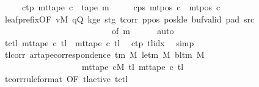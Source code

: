 \begin{isabellebody}
\ \ \ \ \ c{}{\isacharunderscore}{\kern0pt}tp{\isacharcolon}{\kern0pt}\ {\isachardoublequoteopen}mt{\isacharunderscore}{\kern0pt}tape\ c{}\ {\isacharequal}{\kern0pt}\ {\isacharquery}{\kern0pt}tape\ {\isacharquery}{\kern0pt}m{}{\isachardoublequoteclose}\isanewline
\ \ \ \ \ c{}{\isacharunderscore}{\kern0pt}ps{\isacharcolon}{\kern0pt}\ {\isachardoublequoteopen}mt{\isacharunderscore}{\kern0pt}pos\ c{}\ {\isacharequal}{\kern0pt}\ mt{\isacharunderscore}{\kern0pt}pos\ c{}{\isachardoublequoteclose}\isanewline
\ \ \ \ \isamarkupfalse%
\ leaf{\isacharunderscore}{\kern0pt}prefix{\isacharbrackleft}{\kern0pt}OF\ vM\ qQ\ kge{}\ stg{}\ tcorr\ ppos\ poskle\ buf{\isacharunderscore}{\kern0pt}valid\ pad{}\ src{}{\isacharcomma}{\kern0pt}\isanewline
\ \ \ \ \ \ \ \ \ \ \ \ \ \ \ \ \ \ \ \ \ \ \ \ \ \ of\ {\isacharquery}{\kern0pt}m{}{\isacharbrackright}{\kern0pt}\isanewline
\ \ \ \ \isamarkupfalse%
\ auto\isanewline
\ \ \isamarkupfalse%
\ tc{\isacharunderscore}{\kern0pt}tl{\isacharcolon}{\kern0pt}\ {\isachardoublequoteopen}mt{\isacharunderscore}{\kern0pt}tape\ c{}\ {\isacharquery}{\kern0pt}tl\ {\isacharequal}{\kern0pt}\ mt{\isacharunderscore}{\kern0pt}tape\ c{}\ {\isacharquery}{\kern0pt}tl{\isachardoublequoteclose}\ \isamarkupfalse%
\ c{}{\isacharunderscore}{\kern0pt}tp\ tlidx\ \isamarkupfalse%
\ simp\isanewline
\ \ \isamarkupfalse%
\ tl{\isacharunderscore}{\kern0pt}corr{\isacharcolon}{\kern0pt}\ {\isachardoublequoteopen}ar{\isacharunderscore}{\kern0pt}tape{\isacharunderscore}{\kern0pt}correspondence\ {\isacharparenleft}{\kern0pt}{\isasymGamma}{\isacharunderscore}{\kern0pt}tm\ M{\isacharparenright}{\kern0pt}\ {\isacharparenleft}{\kern0pt}le{\isacharunderscore}{\kern0pt}tm\ M{\isacharparenright}{\kern0pt}\ {\isacharparenleft}{\kern0pt}bl{\isacharunderscore}{\kern0pt}tm\ M{\isacharparenright}{\kern0pt}\isanewline
\ \ \ \ \ \ \ \ \ \ \ \ \ \ \ \ \ \ \ {\isacharparenleft}{\kern0pt}mt{\isacharunderscore}{\kern0pt}tape\ cM\ {\isacharquery}{\kern0pt}tl{\isacharparenright}{\kern0pt}\ {\isacharparenleft}{\kern0pt}mt{\isacharunderscore}{\kern0pt}tape\ c{}\ {\isacharquery}{\kern0pt}tl{\isacharparenright}{\kern0pt}{\isachardoublequoteclose}\isanewline
\ \ \ \ \isamarkupfalse%
\ tcorr{\isacharbrackleft}{\kern0pt}rule{\isacharunderscore}{\kern0pt}format{\isacharcomma}{\kern0pt}\ OF\ tl{\isacharunderscore}{\kern0pt}active{\isacharbrackright}{\kern0pt}\ tc{\isacharunderscore}{\kern0pt}tl\ \isamarkupfalse%

\end{isabellebody}
